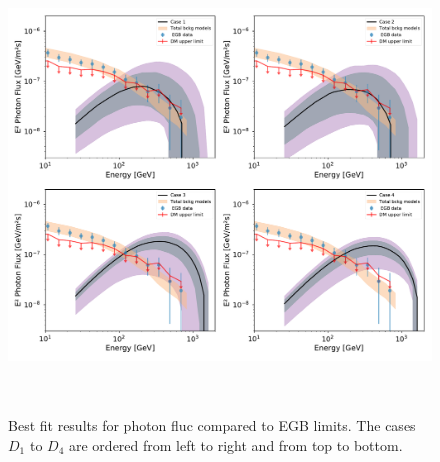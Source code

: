 \documentclass[a4paper,11pt]{article}
\begin{document}
\begin{figure}[htb]
\begin{center}
\includegraphics[height=12cm,width=16cm,angle=0]{Figures/pymultinest_fit_case_5_gamma_rays_EGB.pdf}
\caption{Best fit results for photon fluc compared to EGB limits. The cases $D_1$ to $D_4$ are ordered from left to right and from top to bottom.}
\label{fig:bf-photon-egb-spectrum}
\end{center}
\end{figure}

\clearpage


\end{document}
